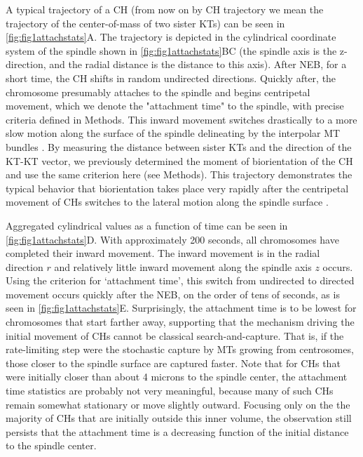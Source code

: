 \documentclass[times, twoside,onecolumn]{zHenriquesLab-StyleBioRxiv}
\begin{document}
 A typical trajectory of a CH (from now on by CH trajectory we mean the trajectory of the center-of-mass of two sister KTs) can be seen in \cref{fig:fig1attachstats}A. The trajectory is depicted in the cylindrical coordinate system of the spindle shown in \cref{fig:fig1attachstats}BC (the spindle axis is the z-direction, and the radial distance is the distance to this axis). After NEB, for a short time, the CH shifts in random undirected directions. Quickly after, the chromosome presumably attaches to the spindle and begins centripetal movement, which we denote the "attachment time" to the spindle, with precise criteria defined in Methods. This inward movement switches drastically to a more slow motion along the surface of the spindle delineating by the interpolar MT bundles \cite{Renda2022}. By measuring the distance between sister KTs and the direction of the KT-KT vector, we previously determined the moment of biorientation of the CH \cite{Renda2022} and use the same criterion here (see Methods). This trajectory demonstrates the typical behavior that biorientation takes place very rapidly after the centripetal movement of CHs switches to the lateral motion along the spindle surface \cite{Renda2022}. 

Aggregated cylindrical values as a function of time can be seen in \cref{fig:fig1attachstats}D. With approximately 200 seconds, all chromosomes have completed their inward movement. The inward movement is in the radial direction $r$ and relatively little inward movement along the spindle axis $z$ occurs. Using the criterion for  `attachment time', this switch from undirected to directed movement occurs quickly after the NEB, on the order of tens of seconds, as is seen in \cref{fig:fig1attachstats}E. Surprisingly, the attachment time is to be lowest for chromosomes that start farther away, supporting that the mechanism driving the initial movement of CHs cannot be classical search-and-capture. That is, if the rate-limiting step were the stochastic capture by MTs growing from centrosomes, those closer to the spindle surface are captured faster. Note that for CHs that were initially closer than about 4 microns to the spindle center, the attachment time statistics are probably not very meaningful, because many of such CHs remain somewhat stationary or move slightly outward. Focusing only on the the majority of CHs that are initially outside this inner volume, the observation still persists that the attachment time is a decreasing function of the initial distance to the spindle center. 
\end{document}
